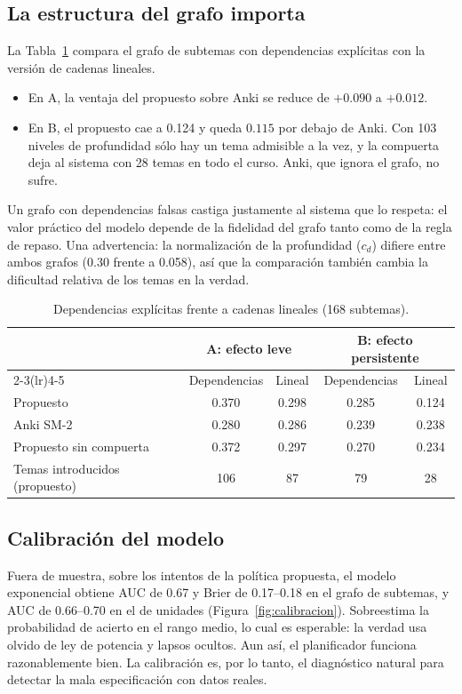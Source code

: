 \documentclass[11pt]{article}
\theoremstyle{definition}
\theoremstyle{remark}
\begin{document}
\subsection{La estructura del grafo importa}

La Tabla~\ref{tab:lineal} compara el grafo de subtemas con dependencias explícitas con la versión de cadenas lineales.
\begin{itemize}
\item En A, la ventaja del propuesto sobre Anki se reduce de $+0.090$ a $+0.012$.
\item En B, el propuesto cae a 0.124 y queda $0.115$ por debajo de Anki. Con 103 niveles de profundidad sólo hay un tema admisible a la vez, y la compuerta deja al sistema con 28 temas en todo el curso. Anki, que ignora el grafo, no sufre.
\end{itemize}
Un grafo con dependencias falsas castiga justamente al sistema que lo respeta: el valor práctico del modelo depende de la fidelidad del grafo tanto como de la regla de repaso. Una advertencia: la normalización de la profundidad ($c_d$) difiere entre ambos grafos (0.30 frente a 0.058), así que la comparación también cambia la dificultad relativa de los temas en la verdad.

\begin{table}[t]
\centering\small
\caption{Dependencias explícitas frente a cadenas lineales (168 subtemas).}
\label{tab:lineal}
\begin{tabular}{lcccc}
\toprule
& \multicolumn{2}{c}{A: efecto leve} & \multicolumn{2}{c}{B: efecto persistente} \\
\cmidrule(lr){2-3}\cmidrule(lr){4-5}
& Dependencias & Lineal & Dependencias & Lineal \\
\midrule
Propuesto & 0.370 & 0.298 & 0.285 & 0.124 \\
Anki SM-2 & 0.280 & 0.286 & 0.239 & 0.238 \\
Propuesto sin compuerta & 0.372 & 0.297 & 0.270 & 0.234 \\
Temas introducidos (propuesto) & 106 & 87 & 79 & 28 \\
\bottomrule
\end{tabular}
\end{table}

\subsection{Calibración del modelo}

Fuera de muestra, sobre los intentos de la política propuesta, el modelo exponencial obtiene AUC de 0.67 y Brier de 0.17--0.18 en el grafo de subtemas, y AUC de 0.66--0.70 en el de unidades (Figura~\ref{fig:calibracion}). Sobreestima la probabilidad de acierto en el rango medio, lo cual es esperable: la verdad usa olvido de ley de potencia y lapsos ocultos. Aun así, el planificador funciona razonablemente bien. La calibración es, por lo tanto, el diagnóstico natural para detectar la mala especificación con datos reales.
\end{document}

